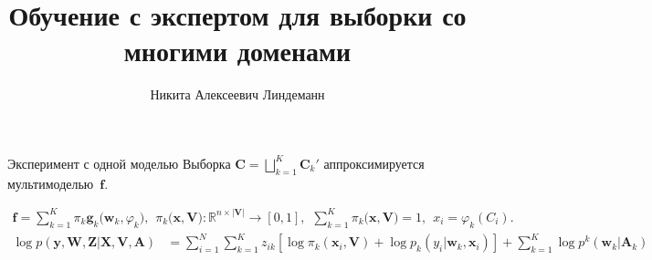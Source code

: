 \documentclass{beamer}
\title[\hbox to 56mm{Порождение признаков}]{Обучение с экспертом для выборки со многими доменами}
\author[Н.\,А. Линдеманн]{Никита Алексеевич Линдеманн}
\institute{Московский физико-технический институт}
\date{\footnotesize
\par\smallskip\emph{Курс:} Автоматизация научных исследований\par (практика, В.\,В.~Стрижов)/Группа 874
\par\smallskip\emph{Эксперт:} В.\,В.~Стрижов
\par\smallskip\emph{Консультант:} А.\,В.~Грабовой
\par\bigskip\small 2021}
\begin{document}
\begin{frame}
\thispagestyle{empty}
\maketitle
\end{frame}
\begin{frame}{Эксперимент с одной моделью}
\small
Выборка \scriptsize $\textbf{C} = \bigsqcup \limits_{k=1}^{K}\textbf{C}_{k}'$ \small аппроксимируется мультимоделью~$\mathbf{f}$.

\scriptsize
\[
\begin{aligned}
\mathbf{f} = \sum_{k=1}^{K}\pi_{k}\mathbf{g}_k\bigr(\mathbf{w}_k, \varphi_k\bigr), \hspace{5pt} \pi_{k}\bigr(\mathbf{x}, \mathbf{V}\bigr):\mathbb{R}^{n\times \left|\mathbf{V}\right|} \to [0, 1], \hspace{5pt} \sum_{k=1}^{K}\pi_{k}\bigr(\mathbf{x}, \mathbf{V}\bigr) = 1, \hspace{5pt} x_i = \varphi_k(C_i).
\end{aligned}
\]
\scriptsize
\begin{equation*}
\begin{aligned}
\log p\left(\textbf{y}, \textbf{W}, \textbf{Z}|\textbf{X}, \textbf{V}, \textbf{A}\right) &= \sum_{i=1}^{N}\sum_{k=1}^{K}z_{ik}\left[\log\pi_k\left(\textbf{x}_i, \textbf{V}\right) + \log p_k\left(y_i|\textbf{w}_{k}, \textbf{x}_{i}\right)\right] + \sum_{k=1}^{K}\log p^{k}\left(\textbf{w}_k|\textbf{A}_k\right)
\end{aligned}
\end{equation*}


\end{frame}
\end{document}
